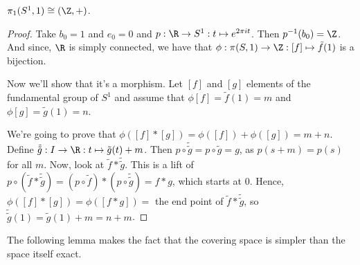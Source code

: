 

\begin{theorem}
    $\pi_1(S^{1}, 1) \cong (\Z, +)$.
\end{theorem}
\begin{proof}
    Take $b_0 = 1$ and $e_0=0$ and $p: \R \to S^{1}: t \mapsto e^{2 \pi i t}$.
    Then $p ^{-1}(b_0) = \Z$.
    And since, $\R$ is simply connected, we have that $\phi: \pi(S, 1) \to  \Z: [f] \mapsto  \tilde f(1)$ is a bijection.

    Now we'll show that it's a morphism.
    Let $[f]$ and $[g]$ elements of the fundamental group of $S^1$ and assume that $\phi[f] = \tilde f(1) = m$ and $\phi[g] = \tilde g(1) = n$.

    We're going to prove that $\phi([f]*[g]) = \phi([f]) + \phi([g]) = m + n$. 
    Define $\tilde{\tilde g}: I \to  \R: t \mapsto  \tilde g(t) + m$.
    Then $p \circ \tilde{\tilde g} = p  \circ  \tilde g = g$, as $p(s+m) = p(s)$ for all  $m$.
    Now, look at $\tilde f * \tilde{\tilde g}$.
    This is a lift of $p  \circ (\tilde f * \tilde{\tilde g}) = (p  \circ  \tilde f) * (p  \circ  \tilde{\tilde{g}}) = f*g$, which starts at $0$.
    Hence, $\phi([f]*[g]) = \phi([f*g]) = $ the end point of  $\tilde f * \tilde{\tilde g}$, so  $\tilde{\tilde{g}}(1) = \tilde g(1) + m = n + m$.
\end{proof}

The following lemma makes the fact that the covering space is simpler than the space itself exact.

